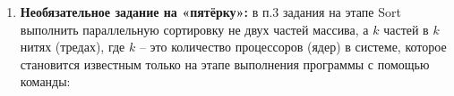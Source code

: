 \begin{enumerate}
    \item\textbf{Необязательное задание на «пятёрку»:} в п.3 задания на этапе Sort выполнить параллельную сортировку не двух частей массива, а $k$ частей в $k$ нитях (тредах), где $k$ – это количество процессоров (ядер) в системе, которое становится известным только на этапе выполнения программы с помощью команды: 
\end{enumerate}
